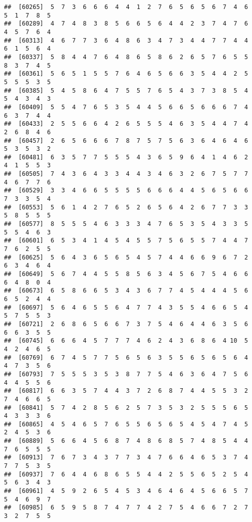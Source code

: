 \documentclass[
]{book}
\begin{document}
\begin{verbatim}
##  [60265]  5  7  3  6  6  6  4  4  1  2  7  6  5  6  5  6  7  4  6  5  1  7  8  5
##  [60289]  4  7  4  8  3  8  5  6  6  5  6  4  4  2  3  7  4  7  6  4  5  7  6  4
##  [60313]  4  6  7  7  3  6  4  8  6  3  4  7  3  4  4  7  7  4  4  6  1  5  6  4
##  [60337]  5  8  4  4  7  6  4  8  6  5  8  6  2  6  5  7  6  5  5  8  3  7  4  5
##  [60361]  5  6  5  1  5  5  7  6  4  6  5  6  6  3  5  4  4  2  5  5  5  5  3  5
##  [60385]  5  4  5  8  6  4  7  5  5  7  6  5  4  3  7  3  8  5  4  5  4  3  4  3
##  [60409]  5  5  4  7  6  5  3  5  4  4  5  6  6  5  6  6  6  7  4  6  3  7  4  4
##  [60433]  2  5  5  6  6  4  2  6  5  5  5  4  6  3  5  4  4  7  4  2  6  8  4  6
##  [60457]  2  6  5  6  6  6  7  8  7  5  7  5  6  3  6  4  6  4  6  5  3  5  3  2
##  [60481]  6  3  5  7  7  5  5  5  4  3  6  5  9  6  4  1  4  6  2  4  1  5  5  3
##  [60505]  7  4  3  6  4  3  3  4  4  3  4  6  3  2  6  7  5  7  7  4  6  7  7  6
##  [60529]  3  3  4  6  6  5  5  5  5  6  6  6  4  4  5  6  5  6  6  7  3  3  5  4
##  [60553]  5  6  1  4  2  7  6  5  2  6  5  6  4  2  6  7  7  3  3  5  8  5  5  5
##  [60577]  8  5  5  5  4  6  3  3  3  4  7  6  5  3  5  4  3  3  5  5  5  4  6  3
##  [60601]  6  5  3  4  1  4  5  4  5  5  7  5  6  5  5  7  4  4  7  7  6  2  5  5
##  [60625]  5  6  4  3  6  5  6  5  4  5  7  4  4  6  6  9  6  7  2  6  3  4  6  4
##  [60649]  5  6  7  4  4  5  5  8  5  6  3  4  5  6  7  5  4  6  6  6  4  8  0  4
##  [60673]  6  5  8  6  6  5  3  4  3  6  7  7  4  5  4  4  4  5  6  6  5  2  4  4
##  [60697]  5  6  4  6  5  5  6  4  7  7  4  3  5  5  4  6  6  5  4  5  7  5  5  3
##  [60721]  2  6  8  6  5  6  6  7  3  7  5  4  6  4  4  6  3  5  6  6  6  3  5  5
##  [60745]  6  6  6  4  5  7  7  7  4  6  2  4  3  6  8  6  4 10  5  4  2  4  6  5
##  [60769]  6  7  4  5  7  7  5  6  5  6  3  5  5  6  5  6  5  6  4  4  7  3  5  6
##  [60793]  7  5  5  5  3  5  3  8  7  7  5  4  6  3  6  4  7  5  6  4  4  5  5  6
##  [60817]  6  6  3  5  7  4  4  3  7  2  6  8  7  4  4  5  5  3  2  7  4  6  6  5
##  [60841]  5  7  4  2  8  5  6  2  5  7  3  5  3  2  5  5  5  6  5  4  3  3  3  6
##  [60865]  4  5  4  6  5  7  6  5  5  6  5  6  5  4  5  4  7  4  5  2  4  5  3  6
##  [60889]  5  6  6  4  5  6  8  7  4  8  6  8  5  7  4  8  5  4  4  7  6  5  5  5
##  [60913]  7  6  7  3  4  3  7  7  3  4  7  6  6  4  6  5  3  7  4  7  7  5  3  5
##  [60937]  7  6  4  4  6  8  6  5  5  4  4  2  5  5  6  5  2  5  4  5  6  3  4  3
##  [60961]  4  5  9  2  6  5  4  5  3  4  6  4  6  4  5  6  6  5  7  5  4  6  9  7
##  [60985]  6  5  9  5  8  7  4  7  7  4  2  7  5  4  6  6  7  2  7  3  2  7  5  5

\end{verbatim}
\end{document}
